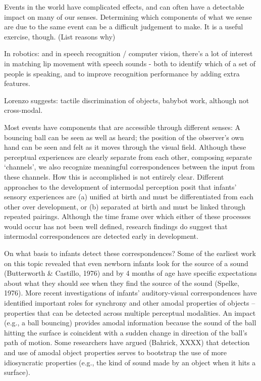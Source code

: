
Events in the world have complicated effects, and can often have
a detectable impact on many of our senses.  Determining which
components of what we sense are due to the same event can be a 
difficult judgement to make.  It is a useful exercise, though.
(List reasons why)


\cite{lewkowicz00development}
\cite{lewkowicz80crossmodal}
\cite{lewkowicz04learning}
\cite{bahrick04development}
\cite{hernandez01development}
\cite{bahrick03development}
\cite{bahrick00intersensory}
\cite{gibson86ecological}
\cite{prince05synching}

In robotics: and in speech recognition / computer vision, there's
a lot of interest in matching lip movement with speech sounds - 
both to identify which of a set of people is speaking, and to
improve recognition performance by adding extra features.

Lorenzo suggests: tactile discrimination of objects, babybot work,
although not cross-modal.

Most events have components that are accessible through different
senses: A bouncing ball can be seen as well as heard; the position of
the observer's own hand can be seen and felt as it moves through the
visual field.  Although these perceptual experiences are clearly
separate from each other, composing separate `channels', we also
recognize meaningful correspondences between the input from these
channels.  How this is accomplished is not entirely clear.  Different
approaches to the development of intermodal perception posit that
infants' sensory experiences are (a) unified at birth and must be
differentiated from each other over development, or (b) separated at
birth and must be linked through repeated pairings. Although the time
frame over which either of these processes would occur has not been
well defined, research findings do suggest that intermodal
correspondences are detected early in development.

On what basis to infants detect these correspondences?  Some of the
earliest work on this topic revealed that even newborn infants look
for the source of a sound (Butterworth \& Castillo, 1976) and by 4
months of age have specific expectations about what they should see
when they find the source of the sound (Spelke, 1976).  More recent
investigations of infants' auditory-visual correspondences have
identified important roles for synchrony and other amodal properties
of objects -- properties that can be detected across multiple
perceptual modalities.  An impact (e.g., a ball bouncing) provides
amodal information because the sound of the ball hitting the surface
is coincident with a sudden change in direction of the ball's path of
motion.  Some researchers have argued (Bahrick, XXXX) that detection
and use of amodal object properties serves to bootstrap the use of
more idiosyncratic properties (e.g., the kind of sound made by an
object when it hits a surface).

